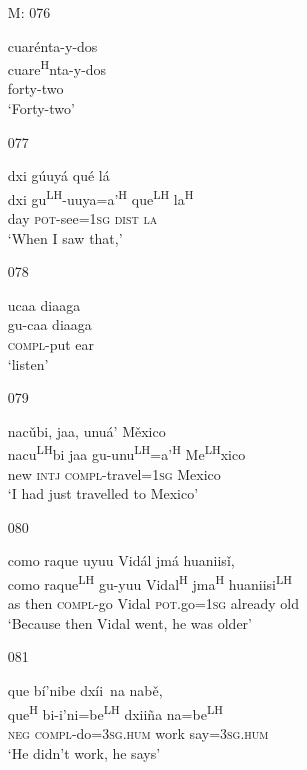 \begin{itemize}
\item[M: 076]
 
\glll   cuar\'{e}nta-y-dos \\
cuare\textsuperscript{H}nta-y-dos \\
forty-two \\
\glt `Forty-two' 
 

\item[077]
 
\glll  dxi g\'{u}uy\'{a} qu\'{e} l\'{a} \\
dxi gu\textsuperscript{LH}-uuya=a'\textsuperscript{H} que\textsuperscript{LH} la\textsuperscript{H} \\
day \textsc{pot}-see=\textsc{1sg} \textsc{dist} \textsc{la} \\
\glt `When  I saw that,'
 

\item[078]
 
\glll  ucaa diaaga \\
gu-caa diaaga \\
\textsc{compl}-put ear \\
\glt `listen'
 


\item[079]
 
\glll   nac\v{u}bi, jaa, unu\'{a}' M\v{e}xico \\ 
nacu\textsuperscript{LH}bi jaa gu-unu\textsuperscript{LH}=a'\textsuperscript{H} Me\textsuperscript{LH}xico \\
new \textsc{intj} \textsc{compl}-travel=\textsc{1sg} Mexico \\
\glt `I had just travelled to Mexico'
 


\item[080]
 
\glll   como raque uyuu Vid\'{a}l jm\'{a} huaniis\v{i}, \\
como raque\textsuperscript{LH} gu-yuu Vidal\textsuperscript{H}  jma\textsuperscript{H} huaniisi\textsuperscript{LH} \\
as then \textsc{compl}-go Vidal \textsc{pot}.go=\textsc{1sg} already old \\
\glt `Because then Vidal went, he was older' 
 


\item[081]
 
\glll   que b\'{i}'nibe dx\'{i}i~{n}a nab\v{e},  \\
que\textsuperscript{H} bi-i'ni=be\textsuperscript{LH} dxii\~{n}a na=be\textsuperscript{LH} \\
\textsc{neg} \textsc{compl}-do=\textsc{3sg.hum} work say=\textsc{3sg.hum} \\
\glt `He didn't work, he says'
 



\end{itemize}

